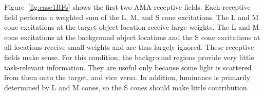 \documentclass{jov}
\begin{document}
Figure~\ref{fig:case1RFs} shows the first two AMA receptive fields.
Each receptive field performs a weighted sum of the L, M, and S cone excitations.
The L and M cone excitations at the target object location receive large weights.
The L and M cone excitations at the background object locations and the S cone excitations at all locations receive small weights and are thus largely ignored. 
These receptive fields make sense.
For this condition, the background regions provide very little task-relevant information. 
They are useful only because some light is scattered from them onto the target, and vice versa. 
In addition, luminance is primarily determined by L and M cones, so the S cones should make little
contribution.

\end{document}
